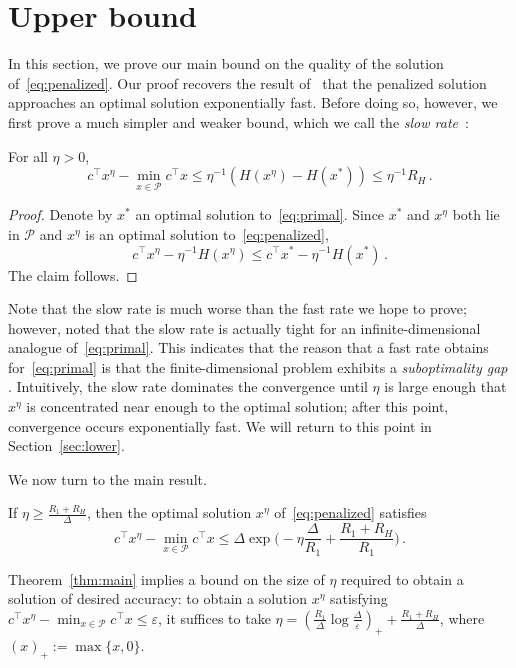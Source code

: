 \documentclass[final,12pt]{colt2018}
\newcommand{\cP}{\mathcal{P}}
\newcommand{\1}{\mathds{1}}
\newcommand*{\ep}{\varepsilon}
\newcommand*{\ent}[1]{H(#1)}
\begin{document}
\section{Upper bound}\label{sec:upper}
In this section, we prove our main bound on the quality of the solution of~\eqref{eq:penalized}.
Our proof recovers the result of~\citet{ComSan94} that the penalized solution approaches an optimal solution exponentially fast.
Before doing so, however, we first prove a much simpler and weaker bound, which we call the \emph{slow rate}~\citep[see][where this analysis also appeared]{FanTsa93,AltWeeRig17}:
\begin{proposition}\label{prop:slow_rate}
For all $\eta > 0$,
\begin{equation*}
c^\top x^\eta - \min_{x \in \cP} c^\top x \leq \eta^{-1} (\ent{x^\eta} - \ent{x^*}) \leq \eta^{-1} R_H\,.
\end{equation*}
\end{proposition}
\begin{proof}
Denote by $x^*$ an optimal solution to~\eqref{eq:primal}.
Since $x^*$ and $x^\eta$ both lie in $\cP$ and $x^\eta$ is an optimal solution to~\eqref{eq:penalized},
\begin{equation*}
c^\top x^\eta - \eta^{-1} \ent{x^\eta} \leq c^\top x^* - \eta^{-1} \ent{x^*}\,.
\end{equation*}
The claim follows.
\end{proof}

Note that the slow rate is much worse than the fast rate we hope to prove; however, \citet{Rig17} noted that the slow rate is actually tight for an infinite-dimensional analogue of~\eqref{eq:primal}.
This indicates that the reason that a fast rate obtains for~\eqref{eq:primal} is that the finite-dimensional problem exhibits a \emph{suboptimality gap} \citep[known as an energy gap in the statistical physics literature; see][]{MezMon09}.
Intuitively, the slow rate dominates the convergence until $\eta$ is large enough that $x^\eta$ is concentrated near enough to the optimal solution; after this point, convergence occurs exponentially fast.
We will return to this point in Section~\ref{sec:lower}.

We now turn to the main result.
\begin{theorem}\label{thm:main}
If $\eta \geq \frac{R_1 + R_H}{\Delta}$, then the optimal solution $x^\eta$ of~\eqref{eq:penalized} satisfies
\begin{equation*}
c^\top x^\eta - \min_{x \in \cP} c^\top x \leq \Delta \exp\Big(-\eta \frac{\Delta}{R_1} + \frac{R_1 + R_H}{R_1}\Big)\,.
\end{equation*}
\end{theorem}
Theorem~\ref{thm:main} implies a bound on the size of $\eta$ required to obtain a solution of desired accuracy: to obtain a solution $x^\eta$ satisfying $c^\top x^\eta - \min_{x \in \cP} c^\top x \leq \ep$, it suffices to take $\eta = \left(\frac{R_1}{\Delta}\log \frac{\Delta}{\ep}\right)_+ + \frac{R_1 + R_H}{\Delta}$, where $(x)_+ := \max\{x, 0\}$.
\end{document}
